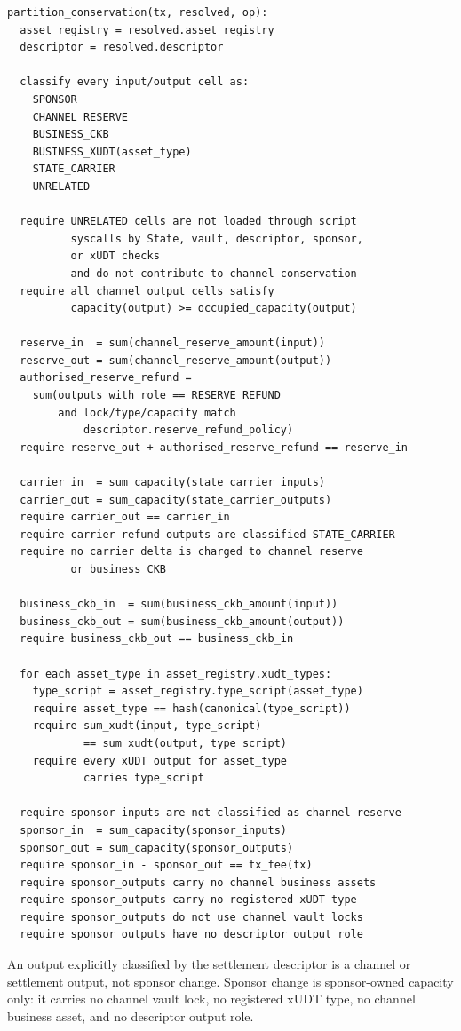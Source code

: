 \documentclass[a4paper,11pt]{article}
\begin{document}
\clearpage
\begin{lstlisting}
partition_conservation(tx, resolved, op):
  asset_registry = resolved.asset_registry
  descriptor = resolved.descriptor

  classify every input/output cell as:
    SPONSOR
    CHANNEL_RESERVE
    BUSINESS_CKB
    BUSINESS_XUDT(asset_type)
    STATE_CARRIER
    UNRELATED

  require UNRELATED cells are not loaded through script
          syscalls by State, vault, descriptor, sponsor,
          or xUDT checks
          and do not contribute to channel conservation
  require all channel output cells satisfy
          capacity(output) >= occupied_capacity(output)

  reserve_in  = sum(channel_reserve_amount(input))
  reserve_out = sum(channel_reserve_amount(output))
  authorised_reserve_refund =
    sum(outputs with role == RESERVE_REFUND
        and lock/type/capacity match
            descriptor.reserve_refund_policy)
  require reserve_out + authorised_reserve_refund == reserve_in

  carrier_in  = sum_capacity(state_carrier_inputs)
  carrier_out = sum_capacity(state_carrier_outputs)
  require carrier_out == carrier_in
  require carrier refund outputs are classified STATE_CARRIER
  require no carrier delta is charged to channel reserve
          or business CKB

  business_ckb_in  = sum(business_ckb_amount(input))
  business_ckb_out = sum(business_ckb_amount(output))
  require business_ckb_out == business_ckb_in

  for each asset_type in asset_registry.xudt_types:
    type_script = asset_registry.type_script(asset_type)
    require asset_type == hash(canonical(type_script))
    require sum_xudt(input, type_script)
            == sum_xudt(output, type_script)
    require every xUDT output for asset_type
            carries type_script

  require sponsor inputs are not classified as channel reserve
  sponsor_in  = sum_capacity(sponsor_inputs)
  sponsor_out = sum_capacity(sponsor_outputs)
  require sponsor_in - sponsor_out == tx_fee(tx)
  require sponsor_outputs carry no channel business assets
  require sponsor_outputs carry no registered xUDT type
  require sponsor_outputs do not use channel vault locks
  require sponsor_outputs have no descriptor output role
\end{lstlisting}

An output explicitly classified by the settlement descriptor is a channel or
settlement output, not sponsor change. Sponsor change is sponsor-owned capacity
only: it carries no channel vault lock, no registered xUDT type, no channel
business asset, and no descriptor output role.
\end{document}
